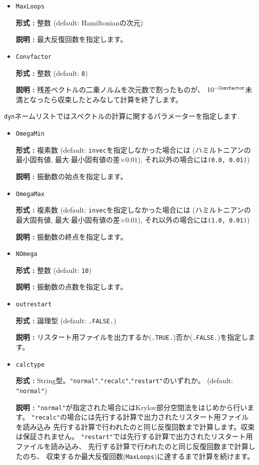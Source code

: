 \documentclass[12pt,titlepage]{jarticle}
\begin{document}
\begin{itemize}
\item  \verb|MaxLoops|
  
  {\bf 形式 :} 整数 (default: Hamiltonianの次元)

  {\bf 説明 :} 最大反復回数を指定します。
  
\item  \verb|Convfactor|
  
  {\bf 形式 :} 整数 (default: \verb|8|)

  {\bf 説明 :} 残差ベクトルの二乗ノルムを次元数で割ったものが、
  $10^{-{\tt Convfactor}}$未満となったら収束したとみなして計算を終了します。
  
\end{itemize}

\verb|dyn|ネームリストではスペクトルの計算に関するパラメーターを指定します.

\begin{itemize}
\item  \verb|OmegaMin|
  
  {\bf 形式 :} 複素数 (default: \verb|invec|を指定しなかった場合には
  (ハミルトニアンの最小固有値, 最大$\cdot$最小固有値の差$\times0.01$),
  それ以外の場合には\verb|(0.0, 0.01)|)

  {\bf 説明 :} 振動数の始点を指定します。
  
\item  \verb|OmegaMax|
  
  {\bf 形式 :} 複素数 (default: \verb|invec|を指定しなかった場合には
  (ハミルトニアンの最大固有値, 最大$\cdot$最小固有値の差$\times0.01$),
  それ以外の場合には\verb|(1.0, 0.01)|)

  {\bf 説明 :} 振動数の終点を指定します。
  
\item  \verb|NOmega|
  
  {\bf 形式 :} 整数 (default: \verb|10|)

  {\bf 説明 :} 振動数の点数を指定します。
  
\item \verb|outrestart|
  
  {\bf 形式 :} 論理型 (default: \verb|.FALSE.|)

  {\bf 説明 :} リスタート用ファイルを出力するか(\verb|.TRUE.|)否か(\verb|.FALSE.|)を指定します。

\item  \verb|calctype|
  
  {\bf 形式 :} String型。\verb|"normal"|,\verb|"recalc"|,\verb|"restart"|のいずれか。
  (default: \verb|"normal"|)

  {\bf 説明 :} \verb|"normal"|が指定された場合にはKrylov部分空間法をはじめから行います。
  \verb|"recalc"|の場合には先行する計算で出力されたリスタート用ファイルを読み込み
  先行する計算で行われたのと同じ反復回数まで計算します。収束は保証されません。
  \verb|"restart"|では先行する計算で出力されたリスタート用ファイルを読み込み、
  先行する計算で行われたのと同じ反復回数まで計算したのち、
  収束するか最大反復回数(\verb|MaxLoops|)に達するまで計算を続けます。

\end{itemize} 
  
\end{document}
